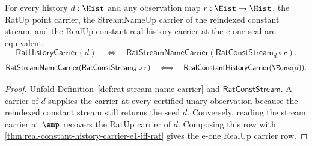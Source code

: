 \begin{theorem}
\label{thm:real-constant-stream-carrier-reindexed-streamname-bridge}
For every history $d:\Hist$ and any observation map $r:\Hist\to\Hist$, the
RatUp point carrier, the StreamNameUp carrier of the reindexed constant stream,
and the RealUp constant real-history carrier at the e-one seal are equivalent:
$$
\mathsf{RatHistoryCarrier}(d)
\quad\Longleftrightarrow\quad
\mathsf{RatStreamNameCarrier}(\mathsf{RatConstStream}_d\circ r).
$$
$$
\mathsf{RatStreamNameCarrier}(\mathsf{RatConstStream}_d\circ r)
\quad\Longleftrightarrow\quad
\mathsf{RealConstantHistoryCarrier}(\Eone(d)).
$$
\end{theorem}
\begin{proof}
Unfold Definition~\ref{def:rat-stream-name-carrier} and
$\mathsf{RatConstStream}$. A carrier of $d$ supplies the carrier at every
certified unary observation because the reindexed constant stream still returns
the seed $d$. Conversely, reading the stream carrier at $\emp$ recovers the
RatUp carrier of $d$. Composing this row with
\autoref{thm:real-constant-history-carrier-e1-iff-rat} gives the e-one RealUp
carrier row.
\end{proof}
